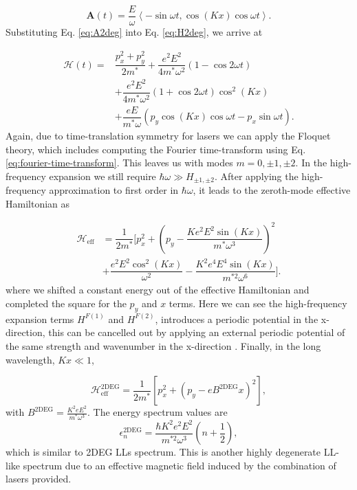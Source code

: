 \documentclass[aps,prb,twocolumn,showpacs,superscriptaddress]{revtex4-2}
\renewcommand{\vec}[1]{\mathbf{#1}}
\newcommand{\ham}{\mathcal{H}}
\begin{document}
\begin{equation}\label{eq:A2deg}
  \vec{A}(t)= \dfrac{E}{\omega} \left\langle -\sin \omega t, \cos{(Kx)} \cos{\omega t} \right\rangle.
\end{equation}%
Substituting Eq. \eqref{eq:A2deg} into Eq. \eqref{eq:H2deg}, we arrive at

\begin{align}\label{eq:H2time}
  \ham(t) = &\dfrac{p_x^2 + p_y^2}{2m^*} + \dfrac{e^2 E^2}{4m^* \omega^2}(1-\cos{2\omega t}) \nonumber \\
  &+ \dfrac{e^2 E^2}{4m^*\omega^2}(1+\cos{2 \omega t}) \cos^2{(Kx)} \nonumber \\
  &+\dfrac{eE}{m^* \omega} \left(p_y \cos{(Kx)}\cos{\omega t} -  p_x \sin{\omega t}\right).
\end{align}
Again, due to time-translation symmetry for lasers we can apply the Floquet theory, which includes computing the Fourier time-transform using Eq. \eqref{eq:fourier-time-transform}.
This leaves us with modes $m=0,\pm1,\pm2$.
In the high-frequency expansion we still require $\hbar \omega \gg H_{\pm1,\pm2}$.
After applying the high-frequency approximation to first order in $\hbar \omega$, it leads to the zeroth-mode effective Hamiltonian as

\begin{align}\label{eq:H2eff}
  \ham_{\text{eff}} &= \dfrac{1}{2m^*} \Biggl[ p_x^2 + \left(p_y - \dfrac{K e^2 E^2 \sin{(Kx)}}{m^*\omega^3} \right)^2 \nonumber \\
  &+ \dfrac{e^2 E^2 \cos^2{(Kx)}}{\omega^2}  - \dfrac{K^2 e^4 E^4 \sin{(Kx)}}{m^{*2}\omega^6} \Biggr]. \nonumber
\end{align}
where we shifted a constant energy out of the effective Hamiltonian and completed the square for the $p_y$ and $x$ terms.
Here we can see the high-frequency expansion terms $H^{F(1)}$ and $H^{F(2)}$, introduces a periodic potential in the x-direction, this can be cancelled out by applying an external periodic potential of the same strength and wavenumber in the x-direction \cite{supp}.
Finally, in the long wavelength, $Kx \ll 1$,

\begin{equation}\label{eq:Heff2deg}
  \ham_{\text{eff}}^{\text{2DEG}} = \dfrac{1}{2m^*} \left[ p_x^2 + {\left(p_y - eB^{\text{2DEG}}x \right)}^2  \right],
\end{equation}
with $B^{\text{2DEG}} = \tfrac{K^2 e E^2 }{m^*\omega^3}$.
The energy spectrum values are
\begin{equation}\label{eq:2DEGenergy}
  \epsilon_n^{\text{2DEG}} = \dfrac{\hbar K^2 e^2 E^2}{m^{*2}\omega^3} \left(n+\dfrac{1}{2}\right),
\end{equation}
which is similar to 2DEG LLs spectrum.
This is another highly degenerate LL-like spectrum due to an effective magnetic field induced by the combination of lasers provided.
\end{document}
